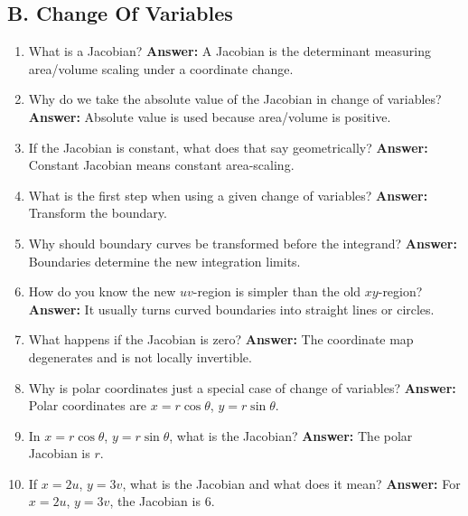 \documentclass[11pt]{article}
\begin{document}
\subsection*{B. Change Of Variables}
\begin{enumerate}
\item What is a Jacobian? \textbf{Answer:} A Jacobian is the determinant measuring area/volume scaling under a coordinate change.
\item Why do we take the absolute value of the Jacobian in change of variables? \textbf{Answer:} Absolute value is used because area/volume is positive.
\item If the Jacobian is constant, what does that say geometrically? \textbf{Answer:} Constant Jacobian means constant area-scaling.
\item What is the first step when using a given change of variables? \textbf{Answer:} Transform the boundary.
\item Why should boundary curves be transformed before the integrand? \textbf{Answer:} Boundaries determine the new integration limits.
\item How do you know the new $uv$-region is simpler than the old $xy$-region? \textbf{Answer:} It usually turns curved boundaries into straight lines or circles.
\item What happens if the Jacobian is zero? \textbf{Answer:} The coordinate map degenerates and is not locally invertible.
\item Why is polar coordinates just a special case of change of variables? \textbf{Answer:} Polar coordinates are $x=r\cos\theta$, $y=r\sin\theta$.
\item In $x=r\cos\theta$, $y=r\sin\theta$, what is the Jacobian? \textbf{Answer:} The polar Jacobian is $r$.
\item If $x=2u$, $y=3v$, what is the Jacobian and what does it mean? \textbf{Answer:} For $x=2u$, $y=3v$, the Jacobian is $6$.
\end{enumerate}
\end{document}
